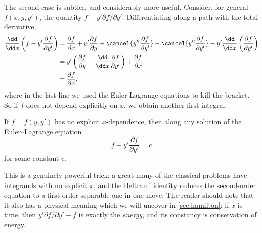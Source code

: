 The second case is subtler, and considerably more useful. Consider, for general $f(x, y, y')$, the quantity $f - y' \partial f/\partial y'$. Differentiating along a path with the total derivative,
\begin{align*}
	\frac{\dd}{\dd x} \left(f - y' \frac{\partial f}{\partial y'}\right) &= \frac{\partial f}{\partial x} + y' \frac{\partial f}{\partial y} + \cancel{y'' \frac{\partial f}{\partial y'}} -\cancel{ y'' \frac{\partial f}{\partial y'}} - y' \frac{\dd}{\dd x}\left(\frac{\partial f}{\partial y'}\right) \\
	&= y' \left(\frac{\partial f}{\partial y} - \frac{\dd}{\dd x} \frac{\partial f}{\partial y'}\right) + \frac{\partial f}{\partial x} \\
	&= \frac{\partial f}{\partial x},
\end{align*}
where in the last line we used the Euler-Lagrange equations to kill the bracket. So if $f$ does not depend explicitly on $x$, we obtain another first integral.

\begin{proposition}\label{prop:beltrami}
	If $f = f(y, y')$ has no explicit $x$-dependence, then along any solution of the Euler--Lagrange equation
	$$
	f - y' \frac{\partial f}{\partial y'} = c
	$$
	for some constant $c$.
\end{proposition}

This is a genuinely powerful trick: a great many of the classical problems have integrands with no explicit $x$, and the Beltrami identity reduces the second-order equation to a first-order separable one in one move. The reader should note that it also has a physical meaning which we will uncover in \autoref{sec:hamilton}: if $x$ is time, then $y'\partial f/\partial y' - f$ is exactly the \emph{energy}, and its constancy is conservation of energy.

